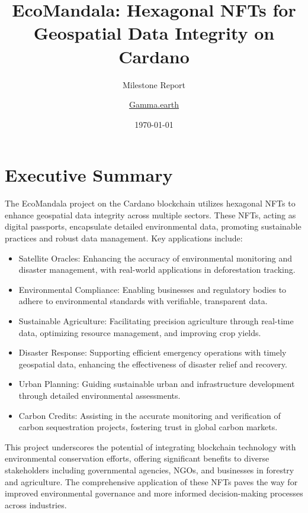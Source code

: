 \documentclass{scrreport}
\title{EcoMandala: Hexagonal NFTs for Geospatial Data Integrity on Cardano}
\subtitle{Milestone Report}
\author{\href{http://Gamma.earth}{Gamma.earth}}
\date{\today}
\begin{document}
\maketitle

\tableofcontents

\chapter*{Executive Summary}
\label{chap:executive summary}

The EcoMandala project on the Cardano blockchain utilizes hexagonal NFTs to enhance geospatial data integrity across multiple sectors. These NFTs, acting as digital passports, encapsulate detailed environmental data, promoting sustainable practices and robust data management. Key applications include:
\begin{itemize}
    \item Satellite Oracles: Enhancing the accuracy of environmental monitoring and disaster management, with real-world applications in deforestation tracking.
    \item Environmental Compliance: Enabling businesses and regulatory bodies to adhere to environmental standards with verifiable, transparent data.
    \item Sustainable Agriculture: Facilitating precision agriculture through real-time data, optimizing resource management, and improving crop yields.
    \item Disaster Response: Supporting efficient emergency operations with timely geospatial data, enhancing the effectiveness of disaster relief and recovery.
    \item Urban Planning: Guiding sustainable urban and infrastructure development through detailed environmental assessments.
    \item Carbon Credits: Assisting in the accurate monitoring and verification of carbon sequestration projects, fostering trust in global carbon markets.
    
\end{itemize}


This project underscores the potential of integrating blockchain technology with environmental conservation efforts, offering significant benefits to diverse stakeholders including governmental agencies, NGOs, and businesses in forestry and agriculture. The comprehensive application of these NFTs paves the way for improved environmental governance and more informed decision-making processes across industries.
\end{document}
